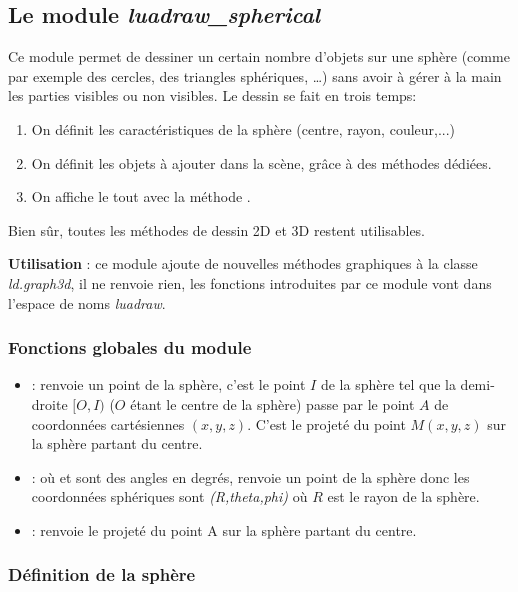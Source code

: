 \subsection{Le module \emph{luadraw\_spherical}}



Ce module permet de dessiner un certain nombre d'objets sur une sphère (comme par exemple des cercles, des triangles sphériques, \ldots) sans avoir à gérer à la main les parties visibles ou non visibles. Le dessin se fait en trois temps:
\begin{enumerate}
    \item On définit les caractéristiques de la sphère (centre, rayon, couleur,...)
    \item On définit les objets à ajouter dans la scène, grâce à des méthodes dédiées.
    \item On affiche le tout avec la méthode .
\end{enumerate}
Bien sûr, toutes les méthodes de dessin 2D et 3D restent utilisables.

\textbf{Utilisation} : ce module ajoute de nouvelles méthodes graphiques à la classe \emph{ld.graph3d}, il ne renvoie rien, les fonctions introduites par ce module vont dans l'espace de noms \emph{luadraw}.

\subsubsection{Fonctions globales du module}

\begin{itemize}
        \item {}: renvoie un point de la sphère, c'est le point $I$ de la sphère tel que la demi-droite $[O,I)$ ($O$ étant le centre de la sphère) passe par le point $A$ de coordonnées cartésiennes $(x,y,z)$. C'est le projeté du point $M(x,y,z)$ sur la sphère partant du centre.
        
        \item {}: où  et  sont des angles en degrés, renvoie un point de la sphère donc les coordonnées sphériques sont \emph{(R,theta,phi)} où $R$ est le rayon de la sphère.
        
        \item {}: renvoie le projeté du point \argu A sur la sphère partant du centre.
\end{itemize}

\subsubsection{Définition de la sphère}

